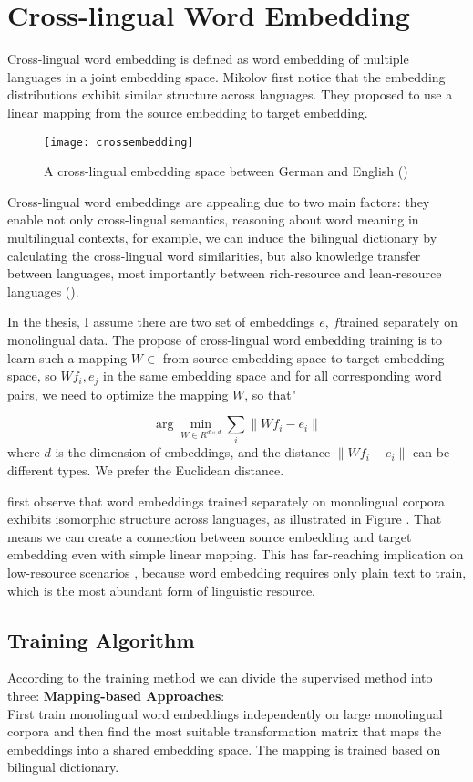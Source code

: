\section{ Cross-lingual Word Embedding}



	Cross-lingual word embedding is defined as word embedding of multiple languages in a joint embedding space. Mikolov first notice that the embedding distributions exhibit similar structure across languages. They proposed to use a linear mapping from the source embedding to target embedding. \\
	\begin{figure}[t]
		\texttt{[image: crossembedding]}
		\centering
		\caption{A cross-lingual embedding space between German and English (\cite{ruder2017survey})}
	\end{figure}
	
	Cross-lingual word embeddings are appealing due to two main factors: they enable not only cross-lingual semantics, reasoning about word meaning in multilingual contexts, for example, we can induce the bilingual dictionary by calculating the cross-lingual word similarities, but also knowledge transfer between languages, most importantly between rich-resource and lean-resource languages (\cite{adams2017cross}). 

	In the thesis, I assume there are two set of embeddings ${e}$, ${f}$trained separately on monolingual data.  The propose of cross-lingual word embedding training is to learn such a mapping ${W \in }$ from source embedding space to target embedding space, so $Wf_i, e_j$ in the same embedding space and for all corresponding word pairs, we need to optimize the mapping ${W}$, so that"
	 
	
	\[ \arg\min_{W \in R^{d \times d}} \sum_{i} \lVert Wf_i - e_i \rVert \]
	where $d$ is the dimension of embeddings, and the distance ${\lVert Wf_i - e_i \rVert}$ can be different types. We prefer the Euclidean distance.  

first observe that word embeddings trained separately on monolingual corpora exhibits isomorphic structure across languages, as illustrated in Figure {}. That means we can create a connection between source embedding and target embedding even with simple linear mapping. This has far-reaching implication on low-resource scenarios {}{}{}, because word embedding requires only plain text to train, which is the most abundant form of linguistic resource.
	

\subsection{Training Algorithm}
According to the training method we can divide the supervised method into three:
\textbf{Mapping-based Approaches}: \\
First train monolingual word embeddings independently on large monolingual corpora and then find the most suitable transformation matrix that maps the embeddings into a shared embedding space. The mapping is trained based on bilingual dictionary.


